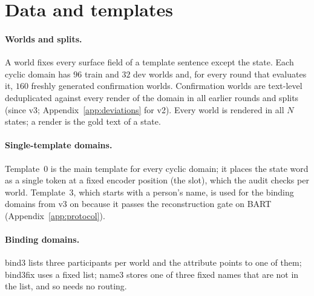 \section{Data and templates}\label{app:data}
\paragraph{Worlds and splits.}
A world fixes every surface field of a template sentence except the state. Each cyclic domain has $96$ train and $32$ dev worlds and,
for every round that evaluates it, $160$ freshly generated confirmation worlds. Confirmation worlds are text-level deduplicated against
every render of the domain in all earlier rounds and splits (since v3; Appendix~\ref{app:deviations} for v2). Every world is rendered in
all $N$ states; a render is the gold text of a state.

\paragraph{Single-template domains.}
Template~0 is the main template for every cyclic domain; it places the state word as a single token at a fixed encoder position (the
slot), which the audit checks per world. Template~3, which starts with a person's name, is used for the binding domains from v3 on
because it passes the reconstruction gate on BART (Appendix~\ref{app:protocol}).

\paragraph{Binding domains.}
bind3 lists three participants per world and the attribute points to one of them; bind3fix uses a fixed list; name3 stores one of three
fixed names that are not in the list, and so needs no routing.

